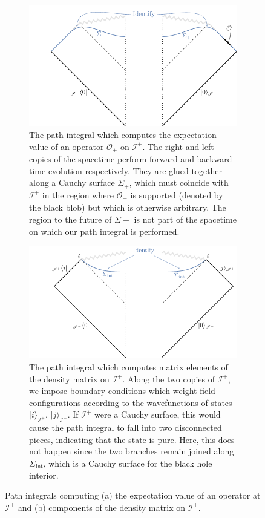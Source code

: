 \documentclass[letterpaper,12pt]{article}
\newcommand*{\scri}{\mathscr{I}} %
\begin{document}
\begin{figure}[hb]
\centering
\begin{subfigure}[b]{.48\textwidth}\centering
	\includegraphics[width=\textwidth]{HawkingO.pdf}
	\caption{The path integral which computes the expectation value of an operator $\mathcal{O}_+$ on $\scri^+$. The right and left copies of the spacetime perform forward and backward time-evolution respectively. They are glued together along a Cauchy surface $\Sigma_+$, which must coincide with $\scri^+$ in the region where $\mathcal{O}_+$ is supported (denoted by the black blob) but which is otherwise arbitrary. The region to the future of $\Sigma+$ is not part of the spacetime on which our path integral is performed. \label{fig:HawkingO}}
\end{subfigure}
\hfill
\begin{subfigure}[b]{.48\textwidth}\centering
	\includegraphics[width=\textwidth]{HawkingRho.pdf}
		\caption{The path integral which computes matrix elements  of the density matrix on $\scri^+$. Along the two copies of $\scri^+$, we impose boundary conditions which weight field configurations according to the wavefunctions of states $|i\rangle_{\scri^+}$, $|j\rangle_{\scri^+}$.  If $\scri^+$ were a Cauchy surface, this would cause the path integral to fall into two disconnected pieces, indicating that the state is pure. Here, this does not happen since the two branches remain joined along $\Sigma_\mathrm{int}$, which is a Cauchy surface for the black hole interior.\label{fig:HawkingRho}}
\end{subfigure}
\caption{Path integrals computing (a) the expectation value of an operator at $\scri^+$ and (b) components of the density matrix on $\scri^+$.}
\label{fig:HawkPI}
\end{figure}
\end{document}
